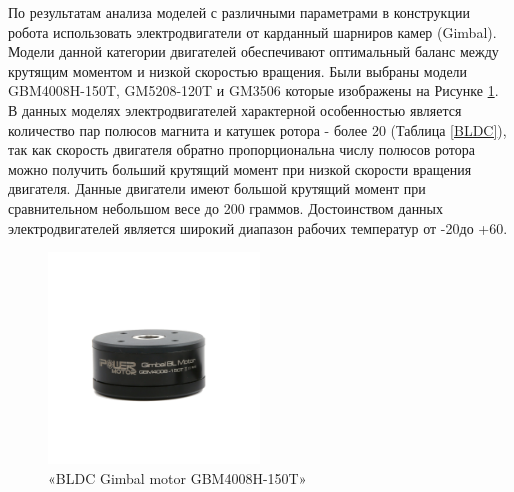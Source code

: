 По результатам анализа моделей с различными параметрами в конструкции робота использовать электродвигатели от карданный шарниров камер (Gimbal). Модели данной категории двигателей обеспечивают оптимальный баланс между крутящим моментом и низкой скоростью вращения. Были выбраны модели GBM4008H-150T, GM5208-120T и GM3506 которые изображены на Рисунке \ref{GBM4008H}. В данных моделях электродвигателей характерной особенностью является количество пар полюсов магнита и катушек ротора - более 20 (Таблица \ref{BLDC}), так как скорость двигателя обратно пропорциональна числу полюсов ротора можно получить больший крутящий момент при низкой скорости вращения двигателя. Данные двигатели имеют большой крутящий момент при сравнительном небольшом весе до 200 граммов. Достоинством данных электродвигателей является широкий диапазон рабочих температур от -20\textdegree  до +60\textdegree \citep{simplefocBLDCMotors}.


\begin{figure}[H]
	\centering
	\includegraphics[width=0.5\textwidth,trim={5cm 10cm 5cm 10cm}]{Src/images/GM4008H-1.png}
	\caption{«BLDC Gimbal motor GBM4008H-150T»}
	\label{GBM4008H}
\end{figure}


